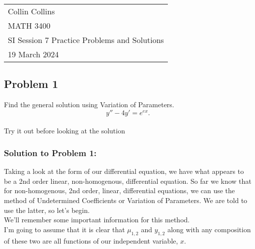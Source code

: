 \documentclass[a4paper,12pt]{article} %
\begin{document}



\thispagestyle{empty} %

\begin{tabular}{p{15.5cm}} %
\\ Collin Collins \\
MATH 3400\\
SI Session 7 Practice Problems and Solutions\\
19 March 2024 \\
\hline %

\end{tabular} 

\subsection*{Problem 1} 
Find the general solution using Variation of Parameters.
$$ y''-4y' = e^{ex}. $$
\\
 
Try it out before looking at the solution
\pagebreak

\subsubsection*{Solution to Problem 1:}
Taking a look at the form of our differential equation, we have what appears to be a 2nd order linear, non-homogenous, differential equation. So far we know that for non-homogenous, 2nd order, linear, differential equations, we can use the method of Undetermined Coefficients or Variation of Parameters. We are told to use the latter, so let's begin.\\

We'll remember some important information for this method.\\

I'm going to assume that it is clear that $\mu_{1,2}$ and $y_{1,2}$ along with any composition of these two are all functions of our independent variable, $x$.\\
\end{document}
